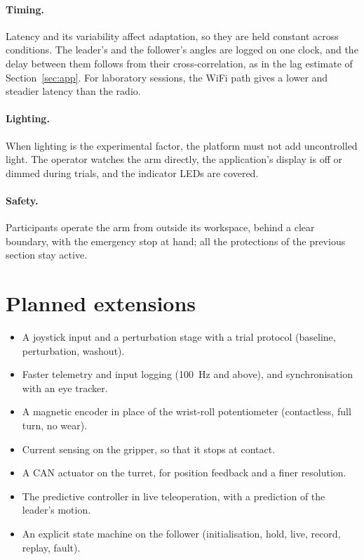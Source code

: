 \documentclass[11pt,a4paper]{article}
\begin{document}
\paragraph{Timing.} Latency and its variability affect adaptation, so they are held constant across conditions.
The leader's and the follower's angles are logged on one clock, and the delay between them follows from their
cross-correlation, as in the lag estimate of Section~\ref{sec:app}. For laboratory sessions, the WiFi path gives
a lower and steadier latency than the radio.

\paragraph{Lighting.} When lighting is the experimental factor, the platform must not add uncontrolled light.
The operator watches the arm directly, the application's display is off or dimmed during trials, and the
indicator LEDs are covered.

\paragraph{Safety.} Participants operate the arm from outside its workspace, behind a clear boundary, with the
emergency stop at hand; all the protections of the previous section stay active.

\section{Planned extensions}

\begin{itemize}
\item A joystick input and a perturbation stage with a trial protocol (baseline, perturbation, washout).
\item Faster telemetry and input logging (\SI{100}{\hertz} and above), and synchronisation with an eye tracker.
\item A magnetic encoder in place of the wrist-roll potentiometer (contactless, full turn, no wear).
\item Current sensing on the gripper, so that it stops at contact.
\item A CAN actuator on the turret, for position feedback and a finer resolution.
\item The predictive controller in live teleoperation, with a prediction of the leader's motion.
\item An explicit state machine on the follower (initialisation, hold, live, record, replay, fault).
\end{itemize}
\end{document}
